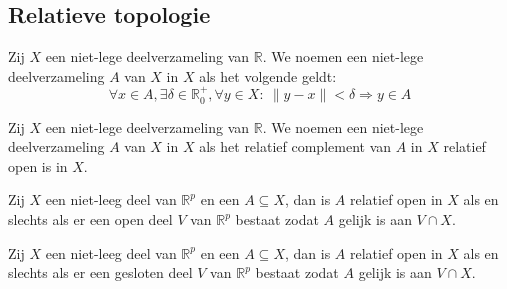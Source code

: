 \documentclass[main.tex]{subfiles}
\begin{document}
\subsection{Relatieve topologie}
\label{sec:relatieve-topologie}

\begin{de}
  Zij $X$ een niet-lege deelverzameling van $\mathbb{R}$.
  We noemen een niet-lege deelverzameling $A$ van $X$  in $X$ als het volgende geldt:
  \[ \forall x\in A, \exists \delta \in \mathbb{R}_{0}^{+}, \forall y\in X:\ \|y-x\| < \delta \Rightarrow y \in A \]
\end{de}

\begin{de}
  Zij $X$ een niet-lege deelverzameling van $\mathbb{R}$.
  We noemen een niet-lege deelverzameling $A$ van $X$  in $X$ als het relatief complement van $A$ in $X$ relatief open is in $X$.
\end{de}

\begin{pr}
  Zij $X$ een niet-leeg deel van $\mathbb{R}^{p}$ en een $A \subseteq X$, dan is $A$ relatief open in $X$ als en slechts als er een open deel $V$ van $\mathbb{R}^{p}$ bestaat zodat $A$ gelijk is aan $V \cap X$.
\end{pr}

\begin{pr}
  Zij $X$ een niet-leeg deel van $\mathbb{R}^{p}$ en een $A \subseteq X$, dan is $A$ relatief open in $X$ als en slechts als er een gesloten deel $V$ van $\mathbb{R}^{p}$ bestaat zodat $A$ gelijk is aan $V \cap X$.
\end{pr}
\end{document}
